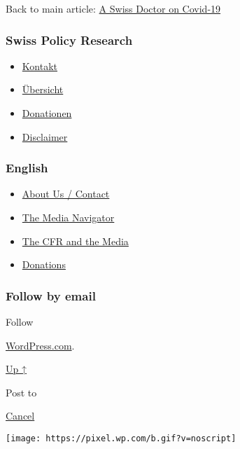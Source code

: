Back to main article:
\href{https://swprs.org/a-swiss-doctor-on-covid-19/}{A Swiss Doctor on
Covid-19}

\hypertarget{swiss-policy-research}{%
\subsubsection{Swiss Policy Research}\label{swiss-policy-research}}

\begin{itemize}
\tightlist
\item
  \href{https://swprs.org/kontakt/}{Kontakt}
\item
  \href{https://swprs.org/uebersicht/}{Übersicht}
\item
  \href{https://swprs.org/donationen/}{Donationen}
\item
  \href{https://swprs.org/disclaimer/}{Disclaimer}
\end{itemize}

\hypertarget{english}{%
\subsubsection{English}\label{english}}

\begin{itemize}
\tightlist
\item
  \href{https://swprs.org/contact/}{About Us / Contact}
\item
  \href{https://swprs.org/media-navigator/}{The Media Navigator}
\item
  \href{https://swprs.org/the-american-empire-and-its-media/}{The CFR
  and the Media}
\item
  \href{https://swprs.org/donations/}{Donations}
\end{itemize}

\hypertarget{follow-by-email}{%
\subsubsection{Follow by email}\label{follow-by-email}}

Follow

\href{https://wordpress.com/?ref=footer_custom_com}{WordPress.com}.

\protect\hyperlink{}{Up ↑}

Post to

\protect\hyperlink{}{Cancel}

\texttt{[image: https://pixel.wp.com/b.gif?v=noscript]}
